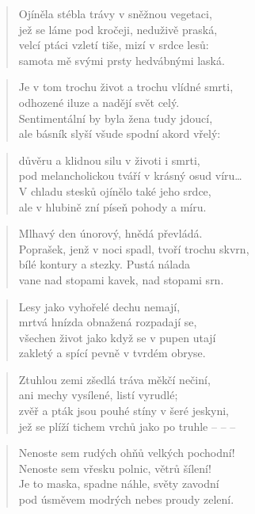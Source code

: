 \documentclass{book}
\begin{document}
\begin{verse}
Ojíněla stébla trávy v sněžnou vegetaci,\\
jež se láme pod kročeji, neduživě praská,\\
velcí ptáci vzletí tiše, mizí v srdce lesů:\\
samota mě svými prsty hedvábnými laská.
\end{verse}
\begin{verse}
Je v tom trochu život a trochu vlídné smrti,\\
odhozené iluze a nadějí svět celý.\\
Sentimentální by byla žena tudy jdoucí,\\
ale básník slyší všude spodní akord vřelý:
\end{verse}
\begin{verse}
důvěru a klidnou silu v životi i smrti,\\
pod melancholickou tváří v krásný osud víru\ldots\\
V chladu stesků ojínělo také jeho srdce,\\
ale v hlubině zní píseň pohody a míru.
\end{verse}
\newpage
{}
\begin{verse}
Mlhavý den únorový, hnědá převládá.\\
Poprašek, jenž v noci spadl, tvoří trochu skvrn,\\
bílé kontury a stezky. Pustá nálada\\
vane nad stopami kavek, nad stopami srn.
\end{verse}
\begin{verse}
Lesy jako vyhořelé dechu nemají,\\
mrtvá hnízda obnažená rozpadají se,\\
všechen život jako když se v pupen utají\\
zakletý a spící pevně v tvrdém obryse.
\end{verse}
\begin{verse}
Ztuhlou zemi zšedlá tráva měkčí nečiní,\\
ani mechy vysílené, listí vyrudlé;\\
zvěř a pták jsou pouhé stíny v šeré jeskyni,\\
jež se plíží tichem vrchů jako po truhle -- -- --
\end{verse}
\begin{verse}
Nenoste sem rudých ohňů velkých pochodní!\\
Nenoste sem vřesku polnic, větrů šílení!\\
Je to maska, spadne náhle, světy zavodní\\
pod úsměvem modrých nebes proudy zelení.
\end{verse}
\end{document}
